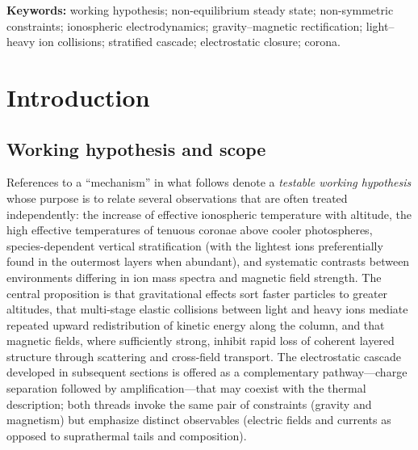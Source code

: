 \documentclass[11pt,a4paper]{article}
\begin{document}
\noindent\textbf{Keywords:} working hypothesis; non-equilibrium steady state; non-symmetric constraints; ionospheric electrodynamics; gravity--magnetic rectification; light--heavy ion collisions; stratified cascade; electrostatic closure; corona.

\section{Introduction}
\label{sec:intro}
\subsection*{Working hypothesis and scope}
References to a ``mechanism'' in what follows denote a \emph{testable working hypothesis} whose purpose is to relate several observations that are often treated independently: the increase of effective ionospheric temperature with altitude, the high effective temperatures of tenuous coronae above cooler photospheres, species-dependent vertical stratification (with the lightest ions preferentially found in the outermost layers when abundant), and systematic contrasts between environments differing in ion mass spectra and magnetic field strength. The central proposition is that gravitational effects sort faster particles to greater altitudes, that multi-stage elastic collisions between light and heavy ions mediate repeated upward redistribution of kinetic energy along the column, and that magnetic fields, where sufficiently strong, inhibit rapid loss of coherent layered structure through scattering and cross-field transport. The electrostatic cascade developed in subsequent sections is offered as a complementary pathway---charge separation followed by amplification---that may coexist with the thermal description; both threads invoke the same pair of constraints (gravity and magnetism) but emphasize distinct observables (electric fields and currents as opposed to suprathermal tails and composition).
\end{document}
